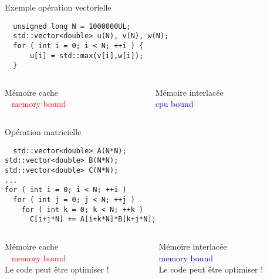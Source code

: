 \documentclass[handout,francais]{beamer}
\begin{document}
\begin{frame}[fragile]{Exemple opération vectorielle}
 \begin{lstlisting}
  unsigned long N = 1000000UL;
  std::vector<double> u(N), v(N), w(N);
  for ( int i = 0; i < N; ++i ) {
      u[i] = std::max(v[i],w[i]);
  }
 \end{lstlisting}

 \begin{columns}[t]
  \begin{column}{0.5\textwidth}
   \textcolor{green!25!black}{Mémoire cache} 
   \\ 
   \textcolor{red}{memory bound}
   \end{column}
   \begin{column}{0.5\textwidth}
   \textcolor{orange!25!black}{Mémoire interlacée}
   \\
   \textcolor{blue}{cpu bound}
  \end{column}
 \end{columns} 
\end{frame}

\begin{frame}[fragile]{Opération matricielle}
 \begin{lstlisting}
  std::vector<double> A(N*N);
std::vector<double> B(N*N);
std::vector<double> C(N*N);
...
for ( int i = 0; i < N; ++i )
  for ( int j = 0; j < N; ++j )
    for ( int k = 0; k < N; ++k )
      C[i+j*N] += A[i+k*N]*B[k+j*N];
 \end{lstlisting}

 \begin{columns}[t]
  \begin{column}{0.5\textwidth}
   \textcolor{green!25!black}{Mémoire cache} 
   \\ 
   \textcolor{red}{memory bound}
   \\
   Le code peut être optimiser !
   \end{column}
   \begin{column}{0.5\textwidth}
   \textcolor{orange!25!black}{Mémoire interlacée}
   \\
   \textcolor{blue}{memory bound}
   \\
   Le code peut être optimiser !
  \end{column}
 \end{columns} 

\end{frame}
\end{document}
